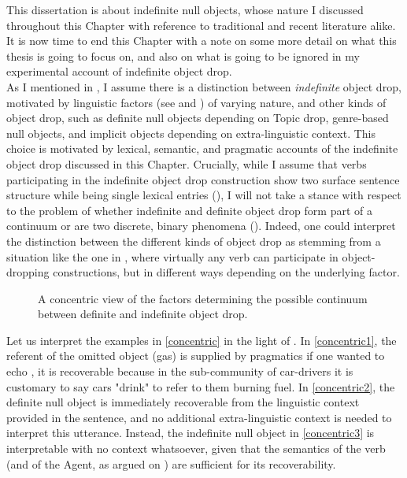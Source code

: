 This dissertation is about indefinite null objects, whose nature I discussed throughout this Chapter with reference to traditional and recent literature alike. It is now time to end this Chapter with a note on some more detail on what this thesis is going to focus on, and also on what is going to be ignored in my experimental account of indefinite object drop.\\
As I mentioned in , I assume there is a distinction between \textit{indefinite} object drop, motivated by linguistic factors (see  and ) of varying nature, and other kinds of object drop, such as definite null objects depending on Topic drop, genre-based null objects, and implicit objects depending on extra-linguistic context. This choice is motivated by lexical, semantic, and pragmatic accounts of the indefinite object drop discussed in this Chapter. Crucially, while I assume that verbs participating in the indefinite object drop construction show two surface sentence structure while being single lexical entries (), I will not take a stance with respect to the problem of whether indefinite and definite object drop form part of a continuum or are two discrete, binary phenomena (). Indeed, one could interpret the distinction between the different kinds of object drop as stemming from a situation like the one in , where virtually any verb can participate in object-dropping constructions, but in different ways depending on the underlying factor.

\begin{figure}[htb]
\caption{A concentric view of the factors determining the possible continuum between definite and indefinite object drop.}
\end{figure}

Let us interpret the examples in \ref{concentric} in the light of . In \ref{concentric1}, the referent of the omitted object (gas) is supplied by pragmatics \textemdash if one wanted to echo \textcite{Glass2020}, it is recoverable because in the sub-community of car-drivers it is customary to say cars "drink" to refer to them burning fuel. In \ref{concentric2}, the definite null object is immediately recoverable from the linguistic context provided in the sentence, and no additional extra-linguistic context is needed to interpret this utterance. Instead, the indefinite null object in \ref{concentric3} is interpretable with no context whatsoever, given that the semantics of the verb (and of the Agent, as argued on ) are sufficient for its recoverability.

